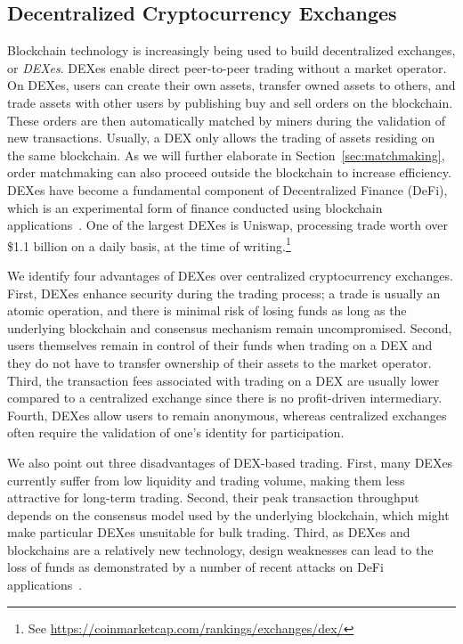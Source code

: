 
\subsection{Decentralized Cryptocurrency Exchanges}
Blockchain technology is increasingly being used to build decentralized exchanges, or \emph{DEXes}.
DEXes enable direct peer-to-peer trading without a market operator.
On DEXes, users can create their own assets, transfer owned assets to others, and trade assets with other users by publishing buy and sell orders on the blockchain.
These orders are then automatically matched by miners during the validation of new transactions.
Usually, a DEX only allows the trading of assets residing on the same blockchain.
As we will further elaborate in Section~\ref{sec:matchmaking}, order matchmaking can also proceed outside the blockchain to increase efficiency.
DEXes have become a fundamental component of Decentralized Finance (DeFi), which is an experimental form of finance conducted using blockchain applications~\cite{chen2020blockchain}.
One of the largest DEXes is Uniswap, processing trade worth over \$1.1 billion on a daily basis, at the time of writing.\footnote{See \url{https://coinmarketcap.com/rankings/exchanges/dex/}}

We identify four advantages of DEXes over centralized cryptocurrency exchanges.
First, DEXes enhance security during the trading process; a trade is usually an atomic operation, and there is minimal risk of losing funds as long as the underlying blockchain and consensus mechanism remain uncompromised.
Second, users themselves remain in control of their funds when trading on a DEX and they do not have to transfer ownership of their assets to the market operator.
Third, the transaction fees associated with trading on a DEX are usually lower compared to a centralized exchange since there is no profit-driven intermediary.
Fourth, DEXes allow users to remain anonymous, whereas centralized exchanges often require the validation of one's identity for participation.

We also point out three disadvantages of DEX-based trading.
First, many DEXes currently suffer from low liquidity and trading volume, making them less attractive for long-term trading.
Second, their peak transaction throughput depends on the consensus model used by the underlying blockchain, which might make particular DEXes unsuitable for bulk trading.
Third, as DEXes and blockchains are a relatively new technology, design weaknesses can lead to the loss of funds as demonstrated by a number of recent attacks on DeFi applications~\cite{gudgeon2020decentralized,qin2020attacking}.

